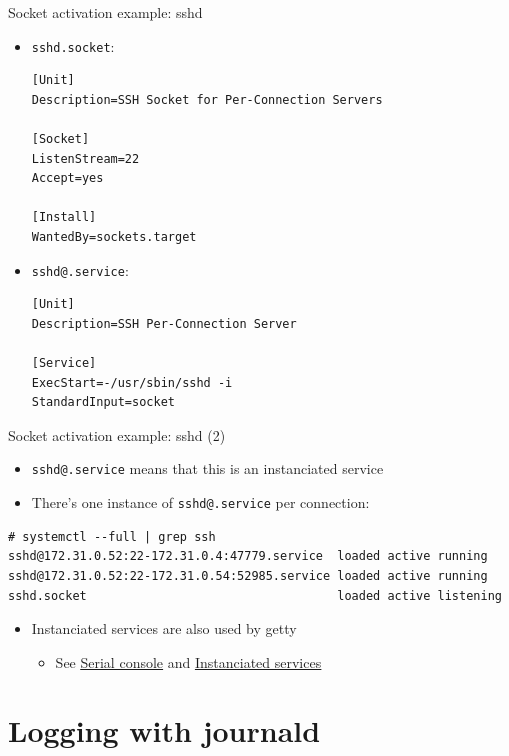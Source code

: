 \documentclass[11pt,final,usepdftitle=false]{beamer}
\begin{document}
\begin{frame}[fragile]{Socket activation example: sshd}
\begin{itemize}
\item \texttt{sshd.socket}:
\begin{lstlisting}[basicstyle=\ttfamily\footnotesize,escapeinside={||}]
[Unit]
Description=SSH Socket for Per-Connection Servers

[Socket]
ListenStream=22
Accept=yes

[Install]
WantedBy=sockets.target
\end{lstlisting}
\item \texttt{sshd@.service}:
\begin{lstlisting}[basicstyle=\ttfamily\footnotesize,escapeinside={||}]
[Unit]
Description=SSH Per-Connection Server

[Service]
ExecStart=-/usr/sbin/sshd -i
StandardInput=socket
\end{lstlisting}
\end{itemize}
\end{frame}

\begin{frame}[fragile]{Socket activation example: sshd (2)}
\begin{itemize}
	\item \texttt{sshd@.service} means that this is an \alert{instanciated service}
	\hbr
\item There's one instance of \texttt{sshd@.service} per connection:
\end{itemize}
\begin{lstlisting}[basicstyle=\ttfamily\scriptsize]
# systemctl --full | grep ssh
sshd@172.31.0.52:22-172.31.0.4:47779.service  loaded active running
sshd@172.31.0.52:22-172.31.0.54:52985.service loaded active running
sshd.socket                                   loaded active listening
\end{lstlisting}
\begin{itemize}
\item Instanciated services are also used by getty
	\begin{itemize}
		\item See \href{http://0pointer.de/blog/projects/serial-console.html}{\ul{Serial console}}
	and \href{http://0pointer.de/blog/projects/instances.html}{\ul{Instanciated services}}
	\end{itemize}
\end{itemize}
\end{frame}

\section{Logging with journald}
\end{document}
